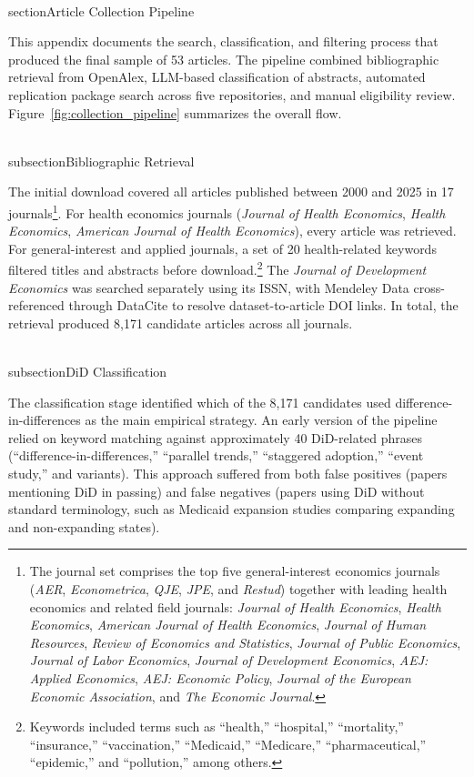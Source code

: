 \\section{Article Collection Pipeline}
\label{AppendixD}

This appendix documents the search, classification, and filtering process that produced the final sample of 53 articles. The pipeline combined bibliographic retrieval from OpenAlex, LLM-based classification of abstracts, automated replication package search across five repositories, and manual eligibility review. Figure~\ref{fig:collection_pipeline} summarizes the overall flow.

\\subsection{Bibliographic Retrieval}

The initial download covered all articles published between 2000 and 2025 in 17 journals\footnote{The journal set comprises the top five general-interest economics journals (\emph{AER}, \emph{Econometrica}, \emph{QJE}, \emph{JPE}, and \emph{Restud}) together with leading health economics and related field journals: \emph{Journal of Health Economics}, \emph{Health Economics}, \emph{American Journal of Health Economics}, \emph{Journal of Human Resources}, \emph{Review of Economics and Statistics}, \emph{Journal of Public Economics}, \emph{Journal of Labor Economics}, \emph{Journal of Development Economics}, \emph{AEJ: Applied Economics}, \emph{AEJ: Economic Policy}, \emph{Journal of the European Economic Association}, and \emph{The Economic Journal}.}. For health economics journals (\emph{Journal of Health Economics}, \emph{Health Economics}, \emph{American Journal of Health Economics}), every article was retrieved. For general-interest and applied journals, a set of 20 health-related keywords filtered titles and abstracts before download.\footnote{Keywords included terms such as ``health,'' ``hospital,'' ``mortality,'' ``insurance,'' ``vaccination,'' ``Medicaid,'' ``Medicare,'' ``pharmaceutical,'' ``epidemic,'' and ``pollution,'' among others.} The \emph{Journal of Development Economics} was searched separately using its ISSN, with Mendeley Data cross-referenced through DataCite to resolve dataset-to-article DOI links. In total, the retrieval produced 8,171 candidate articles across all journals.

\\subsection{DiD Classification}

The classification stage identified which of the 8,171 candidates used difference-in-differences as the main empirical strategy. An early version of the pipeline relied on keyword matching against approximately 40 DiD-related phrases (``difference-in-differences,'' ``parallel trends,'' ``staggered adoption,'' ``event study,'' and variants). This approach suffered from both false positives (papers mentioning DiD in passing) and false negatives (papers using DiD without standard terminology, such as Medicaid expansion studies comparing expanding and non-expanding states).

